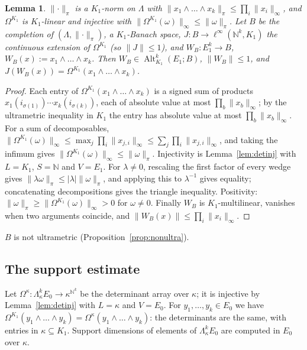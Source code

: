 \documentclass[11pt]{amsart}
\newtheorem{lemma}[theorem]{Lemma}
\theoremstyle{definition}
\theoremstyle{remark}
\numberwithin{equation}{section}
\newcommand{\linf}{\ell^\infty}
\newcommand{\N}{\mathbb{N}}
\newcommand{\Alt}{\operatorname{Alt}}
\newcommand{\abs}[1]{\lvert #1\rvert}
\newcommand{\norm}[1]{\lVert #1\rVert}
\begin{document}
\begin{lemma}\label{lem:proj}
$\norm\cdot_\pi$ is a $K_1$\nobreakdash-norm on $\Lambda$ with $\norm{x_1\wedge\dots\wedge x_k}_\pi\le\prod_i\norm{x_i}_\infty$, and
$\Omega^{K_1}$ is $K_1$\nobreakdash-linear and injective with $\norm{\Omega^{K_1}(\omega)}_\infty\le\norm\omega_\pi$. Let $B$ be the completion of
$(\Lambda,\norm\cdot_\pi)$, a $K_1$\nobreakdash-Banach space, $J\colon B\to\linf(\N^k,K_1)$ the continuous extension of $\Omega^{K_1}$ (so
$\norm J\le1$), and $W_B\colon E_1^k\to B$, $W_B(x):=x_1\wedge\dots\wedge x_k$. Then $W_B\in\Alt^k_{K_1}(E_1;B)$,
$\norm{W_B}\le1$, and $J(W_B(x))=\Omega^{K_1}(x_1\wedge\dots\wedge x_k)$.
\end{lemma}

\begin{proof}
Each entry of $\Omega^{K_1}(x_1\wedge\dots\wedge x_k)$ is a signed sum of products $x_{1}(i_{\sigma(1)})\cdots x_{k}(i_{\sigma(k)})$,
each of absolute value at most $\prod_b\norm{x_b}_\infty$; by the ultrametric inequality in $K_1$ the entry has absolute
value at most $\prod_b\norm{x_b}_\infty$. For a sum of decomposables,
$\norm{\Omega^{K_1}(\omega)}_\infty\le\max_j\prod_i\norm{x_{j,i}}_\infty\le\sum_j\prod_i\norm{x_{j,i}}_\infty$, and taking the infimum
gives $\norm{\Omega^{K_1}(\omega)}_\infty\le\norm\omega_\pi$. Injectivity is Lemma~\ref{lem:detinj} with $L=K_1$, $S=\N$ and
$V=E_1$. For $\lambda\neq0$, rescaling the first factor of every wedge gives $\norm{\lambda\omega}_\pi\le\abs\lambda\norm
\omega_\pi$, and applying this to $\lambda^{-1}$ gives equality; concatenating decompositions gives the triangle
inequality. Positivity: $\norm\omega_\pi\ge\norm{\Omega^{K_1}(\omega)}_\infty>0$ for $\omega\ne0$. Finally $W_B$ is $K_1$\nobreakdash-multilinear,
vanishes when two arguments coincide, and $\norm{W_B(x)}\le\prod_i\norm{x_i}_\infty$.
\end{proof}

$B$ is not ultrametric (Proposition~\ref{prop:nonultra}).

\subsection{The support estimate}\label{ssec:suppest}
Let $\Omega^\kappa\colon\Lambda^k_\kappa E_0\to\kappa^{\N^k}$ be the determinant array over $\kappa$; it is injective by
Lemma~\ref{lem:detinj} with $L=\kappa$ and $V=E_0$. For $y_1,\dots,y_k\in E_0$ we have
$\Omega^{K_1}(y_1\wedge\dots\wedge y_k)=\Omega^\kappa(y_1\wedge\dots\wedge y_k)$: the determinants are the same, with entries in
$\kappa\subseteq K_1$. Support dimensions of elements of $\Lambda^k_\kappa E_0$ are computed in $E_0$ over $\kappa$.
\end{document}
